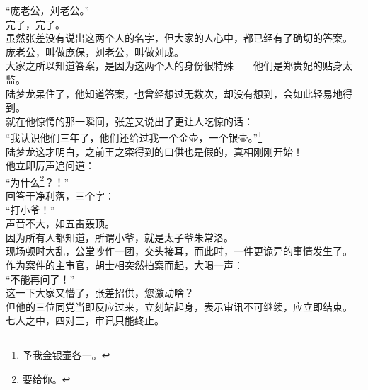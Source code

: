\begin{multicols}{\theparacolNo}
“庞老公，刘老公。”\\

完了，完了。\\

虽然张差没有说出这两个人的名字，但大家的人心中，都已经有了确切的答案。\\

庞老公，叫做庞保，刘老公，叫做刘成。\\

大家之所以知道答案，是因为这两个人的身份很特殊——他们是郑贵妃的贴身太监。\\

陆梦龙呆住了，他知道答案，也曾经想过无数次，却没有想到，会如此轻易地得到。\\

就在他惊愕的那一瞬间，张差又说出了更让人吃惊的话：\\

“我认识他们三年了，他们还给过我一个金壶，一个银壶。”\footnote{予我金银壶各一。}\\

陆梦龙这才明白，之前王之寀得到的口供也是假的，真相刚刚开始！\\

他立即厉声追问道：\\

“为什么\footnote{要给你。}？！”\\

回答干净利落，三个字：\\

“打小爷！”\\

声音不大，如五雷轰顶。\\

因为所有人都知道，所谓小爷，就是太子爷朱常洛。\\

现场顿时大乱，公堂吵作一团，交头接耳，而此时，一件更诡异的事情发生了。\\

作为案件的主审官，胡士相突然拍案而起，大喝一声：\\

“不能再问了！”\\

这一下大家又懵了，张差招供，您激动啥？\\

但他的三位同党当即反应过来，立刻站起身，表示审讯不可继续，应立即结束。\\

七人之中，四对三，审讯只能终止。\\


\end{multicols}
